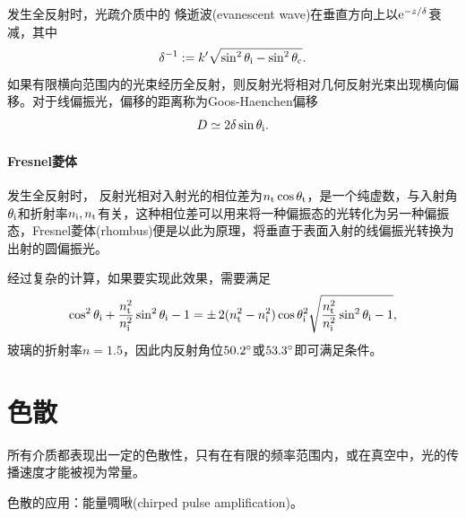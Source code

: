 发生全反射时，光疏介质中的
倏逝波(evanescent wave)在垂直方向上以$\mathop{}\!\mathrm{e}^{-z/\delta}$衰减，其中
\[
    \delta^{-1}:=k'\sqrt{\sin^2\theta_{\mathrm{i}}-\sin^2\theta_\text c}.
\]
如果有限横向范围内的光束经历全反射，则反射光将相对几何反射光束出现横向偏移。对于线偏振光，偏移的距离称为Goos-Haenchen偏移
\[
    D\simeq 2\delta\sin\theta_{\mathrm{i}}.
\]

\paragraph{Fresnel菱体}

发生全反射时，
反射光相对入射光的相位差为$n_\text t\cos\theta_\text t$，是一个纯虚数，与入射角$\theta_{\mathrm{i}}$和折射率$n_{\mathrm{i}},n_\text t$有关，这种相位差可以用来将一种偏振态的光转化为另一种偏振态，Fresnel菱体(rhombus)便是以此为原理，将垂直于表面入射的线偏振光转换为出射的圆偏振光。

经过复杂的计算，如果要实现此效果，需要满足
\[
    \cos^2\theta_{\mathrm{i}}+\frac{n_\text t^2}{n_{\mathrm{i}}^2}\sin^2\theta_{\mathrm{i}}-1=\pm\,2(n_\text t^2-n_{\mathrm{i}}^2)\cos\theta_{\mathrm{i}}^2\sqrt{\frac{n_\text t^2}{n_{\mathrm{i}}^2}\sin^2\theta_{\mathrm{i}}-1},
\]
玻璃的折射率$n=1.5$，因此内反射角位$50.2^\circ$或$53.3^\circ$即可满足条件。


\section{色散}

所有介质都表现出一定的色散性，只有在有限的频率范围内，或在真空中，光的传播速度才能被视为常量。

色散的应用：能量啁啾(chirped pulse amplification)。

